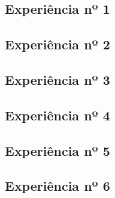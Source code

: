 \subsection{Experiência nº 1}


\subsection{Experiência nº 2}


\subsection{Experiência nº 3}


\subsection{Experiência nº 4}


\subsection{Experiência nº 5}


\subsection{Experiência nº 6}
